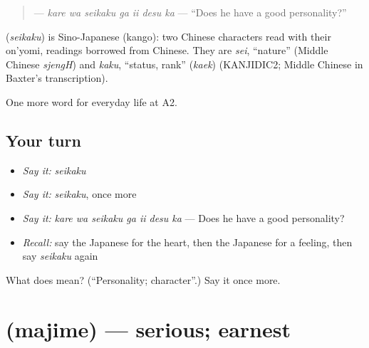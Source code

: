 \begin{quote}
\textbf{  } — \emph{kare wa seikaku ga ii desu ka} — \textquotedblleft{}Does he have a good personality?\textquotedblright{}
\end{quote}

\begin{cousinweb}
\textbf{} (\emph{seikaku}) is Sino-Japanese (kango): two Chinese characters read with their on'yomi, readings borrowed from Chinese. They are \emph{sei}, \textquotedblleft{}nature\textquotedblright{} (Middle Chinese \emph{sjengH}) and \emph{kaku}, \textquotedblleft{}status, rank\textquotedblright{} (\emph{kaek}) (KANJIDIC2; Middle Chinese in Baxter's transcription).
\end{cousinweb}

\begin{grammarlens}[title={What you've built}]
One more word for everyday life at A2.
\end{grammarlens}

\subsection*{Your turn}
\begin{itemize}
\raggedright
  \item \emph{Say it:} \emph{seikaku}
  \item \emph{Say it:} \emph{seikaku}, once more
  \item \emph{Say it:} \emph{kare wa seikaku ga ii desu ka} — Does he have a good personality?
  \item \emph{Recall:} say the Japanese for the heart, then the Japanese for a feeling, then say \emph{seikaku} again
\end{itemize}

\begin{tcolorbox}[breakable,colback=teal!4,colframe=teal!35!black,title={Before you move on}]
What does  mean? (\textquotedblleft{}Personality; character\textquotedblright{}.) Say it once more.
\end{tcolorbox}
\section[\texorpdfstring{\ja{まじめ} (majime)}{まじめ (majime)}]{ (majime) — serious; earnest}

\label{lesson:JA-C249-majime}



